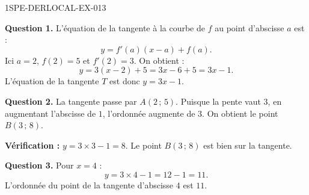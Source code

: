 \begin{corrige}{1SPE-DERLOCAL-EX-013}

\textbf{Question 1.} L'équation de la tangente à la courbe de $f$ au point d'abscisse $a$ est :
\[
y = f'(a)(x - a) + f(a).
\]
Ici $a = 2$, $f(2) = 5$ et $f'(2) = 3$. On obtient :
\[
y = 3(x - 2) + 5 = 3x - 6 + 5 = 3x - 1.
\]
L'équation de la tangente $T$ est donc $\boxed{y = 3x - 1}$.

\textbf{Question 2.} La tangente passe par $A(2\,;\,5)$. Puisque la pente vaut $3$, en augmentant l'abscisse de $1$, l'ordonnée augmente de $3$. On obtient le point $B(3\,;\,8)$.

\textbf{Vérification :} $y = 3 \times 3 - 1 = 8$. Le point $B(3\,;\,8)$ est bien sur la tangente.

\textbf{Question 3.} Pour $x = 4$ :
\[
y = 3 \times 4 - 1 = 12 - 1 = 11.
\]
L'ordonnée du point de la tangente d'abscisse $4$ est $\boxed{11}$.

\end{corrige}
